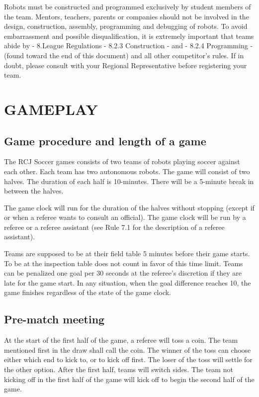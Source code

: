 \documentclass{article}
\begin{document}
Robots must be constructed and programmed exclusively by student members of the team. Mentors, teachers, parents or companies should not be involved in the design, construction, assembly, programming and debugging of robots. To avoid embarrassment and possible disqualification, it is extremely important that teams abide by - 8.League Regulations - 8.2.3 Construction - and - 8.2.4 Programming - (found toward the end of this document) and all other competitor's rules. If in doubt, please consult with your Regional Representative before registering your team.

\newpage

\tableofcontents

\newpage

\section{GAMEPLAY \label{ref-001}}

\subsection{Game procedure and length of a game \label{ref-002}}

The RCJ Soccer games consists of two teams of robots playing soccer against each other. Each team has two autonomous robots. The game will consist of two halves. The duration of each half is 10-minutes. There will be a 5-minute break in between the halves.

The game clock will run for the duration of the halves without stopping (except if or when a referee wants to consult an official). The game clock will be run by a referee or a referee assistant (see Rule 7.1 for the description of a referee assistant).

Teams are supposed to be at their field table 5 minutes before their game starts. To be at the inspection table does not count in favor of this time limit. Teams can be penalized one goal per 30 seconds at the referee's discretion if they are late for the game start. In any situation, when the goal difference reaches 10, the game finishes regardless of the state of the game clock.

\subsection{Pre-match meeting \label{ref-003}}

At the start of the first half of the game, a referee will toss a coin. The team mentioned first in the draw shall call the coin. The winner of the toss can choose either which end to kick to, or to kick off first. The loser of the toss will settle for the other option. After the first half, teams will switch sides. The team not kicking off in the first half of the game will kick off to begin the second half of the game.
\end{document}
